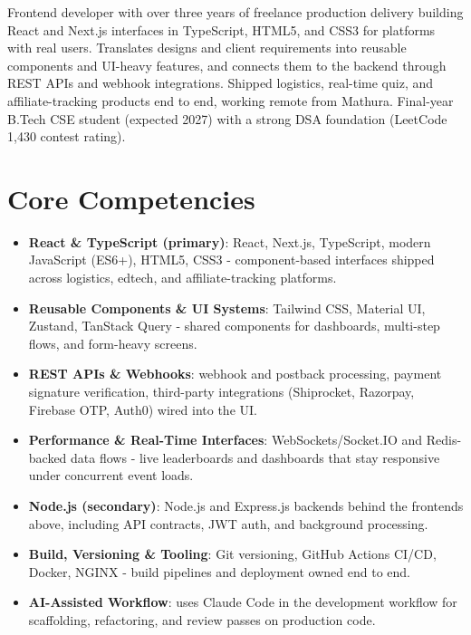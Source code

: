 \documentclass[11pt,a4paper,sans]{moderncv}
\begin{document}
\makecvtitle


\vspace{6pt}
\small{Frontend developer with over three years of freelance production delivery building React and Next.js interfaces in TypeScript, HTML5, and CSS3 for platforms with real users. Translates designs and client requirements into reusable components and UI-heavy features, and connects them to the backend through REST APIs and webhook integrations. Shipped logistics, real-time quiz, and affiliate-tracking products end to end, working remote from Mathura. Final-year B.Tech CSE student (expected 2027) with a strong DSA foundation (LeetCode 1,430 contest rating).}


\section{Core Competencies}
\vspace{1pt}
\begin{itemize}

\item \textbf{React \& TypeScript (primary)}: React, Next.js, TypeScript, modern JavaScript (ES6+), HTML5, CSS3 - component-based interfaces shipped across logistics, edtech, and affiliate-tracking platforms.

\item \textbf{Reusable Components \& UI Systems}: Tailwind CSS, Material UI, Zustand, TanStack Query - shared components for dashboards, multi-step flows, and form-heavy screens.

\item \textbf{REST APIs \& Webhooks}: webhook and postback processing, payment signature verification, third-party integrations (Shiprocket, Razorpay, Firebase OTP, Auth0) wired into the UI.

\item \textbf{Performance \& Real-Time Interfaces}: WebSockets/Socket.IO and Redis-backed data flows - live leaderboards and dashboards that stay responsive under concurrent event loads.

\item \textbf{Node.js (secondary)}: Node.js and Express.js backends behind the frontends above, including API contracts, JWT auth, and background processing.

\item \textbf{Build, Versioning \& Tooling}: Git versioning, GitHub Actions CI/CD, Docker, NGINX - build pipelines and deployment owned end to end.

\item \textbf{AI-Assisted Workflow}: uses Claude Code in the development workflow for scaffolding, refactoring, and review passes on production code.

\end{itemize}
\end{document}
